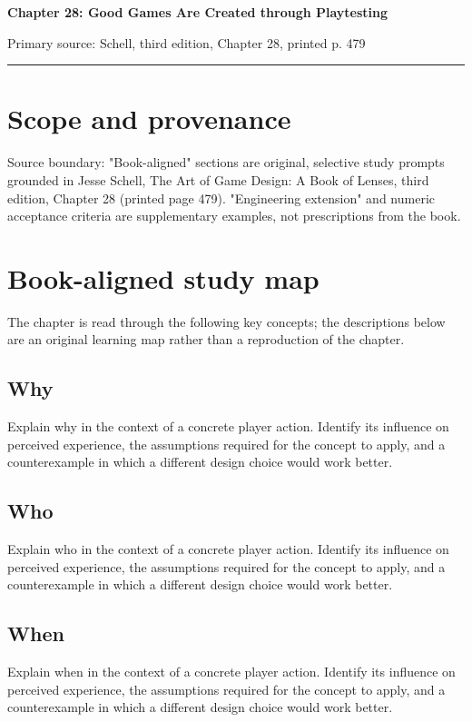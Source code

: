\documentclass[11pt]{article}
\begin{document}
{\huge\bfseries\color{suiteblue} Chapter 28: Good Games Are Created through Playtesting}\par
\vspace{0.15in}
{\normalsize\color{suitegray} Primary source: Schell, third edition, Chapter 28, printed p. 479}\par
\vspace{0.15in}\hrule\vspace{0.15in}

\section{Scope and provenance}
Source boundary: "Book-aligned" sections are original, selective study prompts grounded in Jesse Schell, The Art of Game Design: A Book of Lenses, third edition, Chapter 28 (printed page 479). "Engineering extension" and numeric acceptance criteria are supplementary examples, not prescriptions from the book.


\section{Book-aligned study map}
The chapter is read through the following key concepts; the descriptions below are an original learning map rather than a reproduction of the chapter.


\subsection{Why}
Explain why in the context of a concrete player action. Identify its influence on perceived experience, the assumptions required for the concept to apply, and a counterexample in which a different design choice would work better.


\subsection{Who}
Explain who in the context of a concrete player action. Identify its influence on perceived experience, the assumptions required for the concept to apply, and a counterexample in which a different design choice would work better.


\subsection{When}
Explain when in the context of a concrete player action. Identify its influence on perceived experience, the assumptions required for the concept to apply, and a counterexample in which a different design choice would work better.
\end{document}
